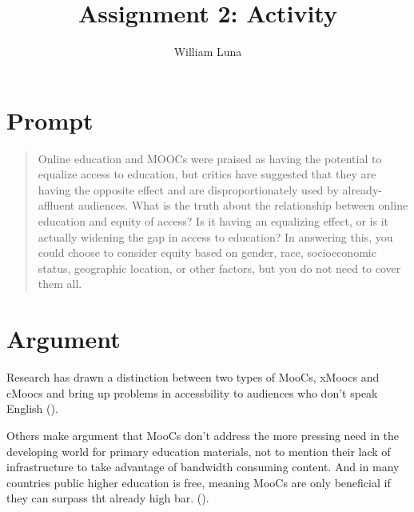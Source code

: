 \documentclass[
	letterpaper, %
]{jdf}
\author{William Luna}
\title{Assignment 2: Activity}
\begin{document}

\maketitle

\section{Prompt} 

\blockquote{Online education and MOOCs were praised as having the potential to equalize access to education, but critics have suggested that they are having the opposite effect and are disproportionately used by already-affluent audiences. What is the truth about the relationship between online education and equity of access? Is it having an equalizing effect, or is it actually widening the gap in access to education? In answering this, you could choose to consider equity based on gender, race, socioeconomic status, geographic location, or other factors, but you do not need to cover them all.}

\section{Argument}

Research has drawn a distinction between two types of MooCs, xMoocs and cMoocs and bring up problems in accessbility to audiences who don't speak English (\cite{Bali2014MOOCPG}).


Others make argument that MooCs don't address the more pressing need in the developing world for primary education materials, not to mention their lack of infrastructure to take advantage of bandwidth consuming content. And in many countries public higher education is free, meaning MooCs are only beneficial if they can surpass tht already high bar.
(\cite{bates2014moocs}).

\end{document}

